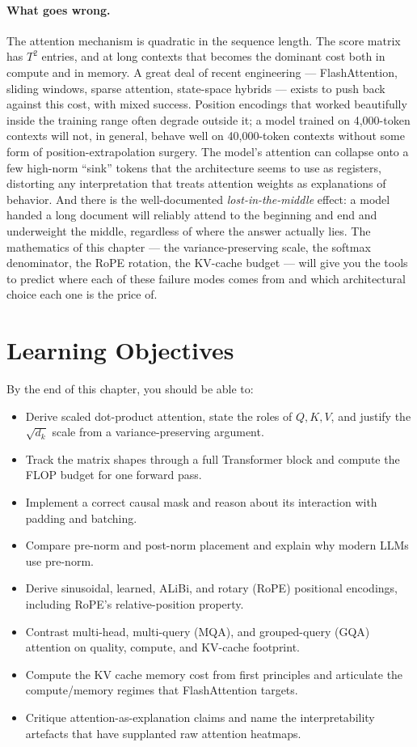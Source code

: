 \paragraph{What goes wrong.}
The attention mechanism is quadratic in the sequence length. The
score matrix has $T^2$ entries, and at long contexts that becomes
the dominant cost both in compute and in memory. A great deal of
recent engineering --- FlashAttention, sliding windows, sparse
attention, state-space hybrids --- exists to push back against this
cost, with mixed success. Position encodings that worked beautifully
inside the training range often degrade outside it; a model trained
on 4{,}000-token contexts will not, in general, behave well on
40{,}000-token contexts without some form of position-extrapolation
surgery. The model's attention can collapse onto a few high-norm
``sink'' tokens that the architecture seems to use as registers,
distorting any interpretation that treats attention weights as
explanations of behavior. And there is the well-documented
\emph{lost-in-the-middle} effect: a model handed a long document
will reliably attend to the beginning and end and underweight the
middle, regardless of where the answer actually lies. The
mathematics of this chapter --- the variance-preserving scale, the
softmax denominator, the RoPE rotation, the KV-cache budget ---
will give you the tools to predict where each of these failure modes
comes from and which architectural choice each one is the price of.

\section{Learning Objectives}

By the end of this chapter, you should be able to:
\begin{itemize}
  \item Derive scaled dot-product attention, state the roles of
        $Q, K, V$, and justify the $\sqrt{d_k}$ scale from a
        variance-preserving argument.
  \item Track the matrix shapes through a full Transformer block and
        compute the FLOP budget for one forward pass.
  \item Implement a correct causal mask and reason about its
        interaction with padding and batching.
  \item Compare pre-norm and post-norm placement and explain why
        modern LLMs use pre-norm.
  \item Derive sinusoidal, learned, ALiBi, and rotary (RoPE)
        positional encodings, including RoPE's relative-position
        property.
  \item Contrast multi-head, multi-query (MQA), and grouped-query
        (GQA) attention on quality, compute, and KV-cache footprint.
  \item Compute the KV cache memory cost from first principles and
        articulate the compute/memory regimes that FlashAttention
        targets.
  \item Critique attention-as-explanation claims and name the
        interpretability artefacts that have supplanted raw attention
        heatmaps.
\end{itemize}

